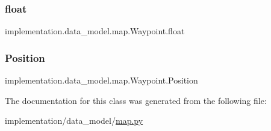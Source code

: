 \subsubsection{\texorpdfstring{float}{float}}
{\footnotesize\ttfamily implementation.\+data\+\_\+model.\+map.\+Waypoint.\+float\hspace{0.3cm}{\ttfamily [static]}}

\mbox{\label{classimplementation_1_1data__model_1_1map_1_1_waypoint_ae8a2c70f60d08768b36f6d06ebfa34d2}} 
\subsubsection{\texorpdfstring{Position}{Position}}
{\footnotesize\ttfamily implementation.\+data\+\_\+model.\+map.\+Waypoint.\+Position\hspace{0.3cm}{\ttfamily [static]}}



The documentation for this class was generated from the following file\+:\begin{DoxyCompactItemize}
\item 
implementation/data\+\_\+model/\hyperlink{map_8py}{map.\+py}\end{DoxyCompactItemize}
